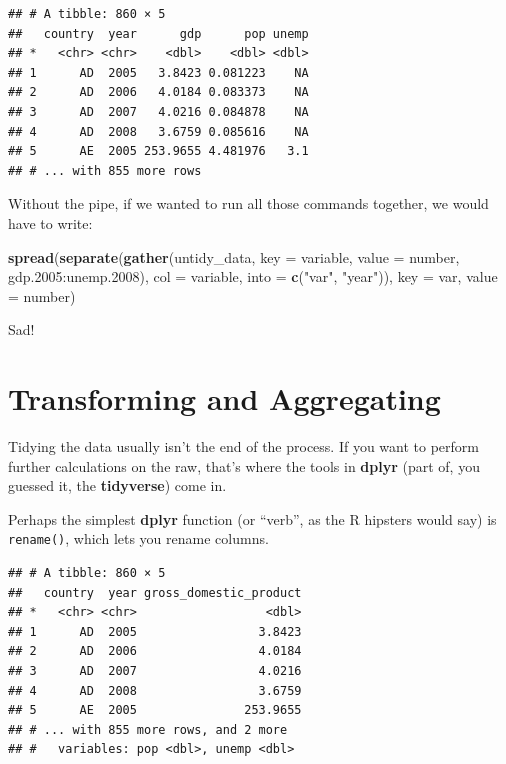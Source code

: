 \documentclass[12pt,oneside,openany]{tufte-book}
\newenvironment{Shaded}{}{}
\newcommand{\KeywordTok}[1]{\textcolor[rgb]{0.00,0.44,0.13}{\textbf{{#1}}}}
\newcommand{\DataTypeTok}[1]{\textcolor[rgb]{0.56,0.13,0.00}{{#1}}}
\newcommand{\FloatTok}[1]{\textcolor[rgb]{0.25,0.63,0.44}{{#1}}}
\newcommand{\StringTok}[1]{\textcolor[rgb]{0.25,0.44,0.63}{{#1}}}
\newcommand{\NormalTok}[1]{{#1}}
\begin{document}
\begin{verbatim}
## # A tibble: 860 × 5
##   country  year      gdp      pop unemp
## *   <chr> <chr>    <dbl>    <dbl> <dbl>
## 1      AD  2005   3.8423 0.081223    NA
## 2      AD  2006   4.0184 0.083373    NA
## 3      AD  2007   4.0216 0.084878    NA
## 4      AD  2008   3.6759 0.085616    NA
## 5      AE  2005 253.9655 4.481976   3.1
## # ... with 855 more rows
\end{verbatim}

Without the pipe, if we wanted to run all those commands together, we
would have to write:

\begin{Shaded}
\begin{Highlighting}[]
\KeywordTok{spread}\NormalTok{(}\KeywordTok{separate}\NormalTok{(}\KeywordTok{gather}\NormalTok{(untidy_data, }\DataTypeTok{key =} \NormalTok{variable, }
    \DataTypeTok{value =} \NormalTok{number, gdp}\FloatTok{.2005}\NormalTok{:unemp}\FloatTok{.2008}\NormalTok{), }\DataTypeTok{col =} \NormalTok{variable, }
    \DataTypeTok{into =} \KeywordTok{c}\NormalTok{(}\StringTok{"var"}\NormalTok{, }\StringTok{"year"}\NormalTok{)), }\DataTypeTok{key =} \NormalTok{var, }\DataTypeTok{value =} \NormalTok{number)}
\end{Highlighting}
\end{Shaded}

Sad!

\section{Transforming and
Aggregating}\label{transforming-and-aggregating}

Tidying the data usually isn't the end of the process. If you want to
perform further calculations on the raw, that's where the tools in
\textbf{dplyr} (part of, you guessed it, the \textbf{tidyverse}) come
in.

Perhaps the simplest \textbf{dplyr} function (or ``verb'', as the R
hipsters would say) is \texttt{rename()}, which lets you rename columns.

\begin{Shaded}
\end{Shaded}

\begin{verbatim}
## # A tibble: 860 × 5
##   country  year gross_domestic_product
## *   <chr> <chr>                  <dbl>
## 1      AD  2005                 3.8423
## 2      AD  2006                 4.0184
## 3      AD  2007                 4.0216
## 4      AD  2008                 3.6759
## 5      AE  2005               253.9655
## # ... with 855 more rows, and 2 more
## #   variables: pop <dbl>, unemp <dbl>
\end{verbatim}
\end{document}
